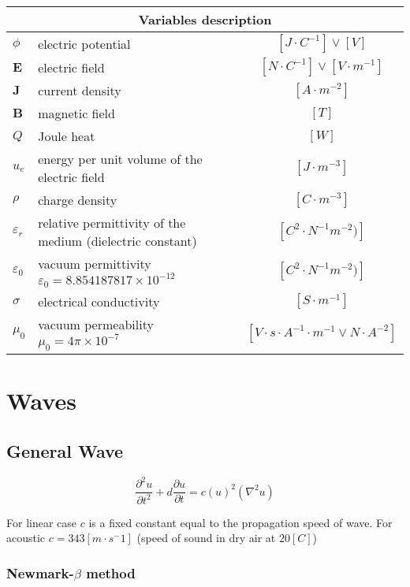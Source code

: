 \documentclass[a4paper,10pt]{book}
\begin{document}
\begin{tabular}{|l|p{6.7cm}|c|}
    \hline
    \multicolumn{3}{|c|}{Variables description} \\
    \hline
    $\phi$ & electric potential & $[J\cdot{C^{-1}}] \vee [V]$ \\
    $\mathbf E$ & electric field & $[N\cdot{C^{-1}}] \vee [V\cdot{m^{-1}}]$ \\
    $\mathbf J$ & current density & $[A\cdot{m^{-2}}]$ \\
    $\mathbf B$ & magnetic field & $[T]$ \\
    $Q$ & Joule heat & $[W]$ \\
    $u_e$ & energy per unit volume of the electric field & $[J\cdot{m^{-3}}]$ \\
    $\rho$ & charge density & $[C\cdot{m^{-3}}]$ \\
    $\varepsilon_r$ & relative permittivity of the medium (dielectric constant) & $[C^2\cdot{N^{-1}m^{-2}})]$ \\
    $\varepsilon_0$ & vacuum permittivity $\varepsilon_0 = 8.854187817\times10^{-12}$ & $[C^2\cdot{N^{-1}m^{-2}})]$ \\
    $\sigma$ & electrical conductivity & $[S\cdot{m^{-1}}]$ \\
    $\mu_0$ & vacuum permeability $\mu_0 = 4\pi\times10^{-7}$ & $[V{\cdot}s{\cdot}A^{-1}{\cdot}m^{-1} \vee N{\cdot}A^{-2}]$ \\
    \hline
\end{tabular}

\section{Waves}

\subsection{General Wave}

    \begin{equation}
    \frac{\partial^2u}{\partial{t}^2}+d\frac{\partial{u}}{\partial{t}}=
    {c(u)}^2\left(\nabla^2u\right)
    \end{equation}

    For linear case $c$ is a fixed constant equal to the propagation speed of wave. For acoustic $c=343 \left[m{\cdot}s^-1\right]$ (speed of sound in dry air at $20 \left[C\right]$)

\subsubsection{Newmark-$\beta$ method}
\end{document}
